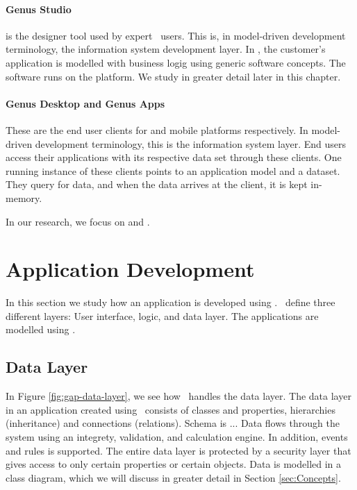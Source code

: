 \paragraph{Genus Studio}
\label{par:Genus Studio}
 is the designer tool used by expert \gap~users. This is, in model-driven development terminology, the information system development layer. In , the customer's application is modelled with business logig using generic software concepts. The software runs on the  platform. We study  in greater detail later in this chapter.

\paragraph{Genus Desktop and Genus Apps}
\label{par:Genus Desktop and Genus Apps}
These are the end user clients for  and mobile platforms respectively. In model-driven development terminology, this is the information system layer. End users access their applications with its respective data set through these clients. One running instance of these clients points to an application model and a dataset. They query  for data, and when the data arrives at the client, it is kept in-memory.

In our research, we focus on  and .


\section{Application Development}
\label{sec:Application Development}
In this section we study how an application is developed using \gap. \genus~define three different layers: User interface, logic, and data layer. The applications are modelled using .

\subsection{Data Layer}
\label{sub:Data Layer}
In Figure \ref{fig:gap-data-layer}, we see how \gap~handles the data layer. The data layer in an application created using \gap~consists of classes and properties, hierarchies (inheritance) and connections (relations). Schema is ... Data flows through the system using an integrety, validation, and calculation engine. In addition, events and rules is supported. The entire data layer is protected by a security layer that gives access to only certain properties or certain objects. Data is modelled in a class diagram, which we will discuss in greater detail in Section \ref{sec:Concepts}.

